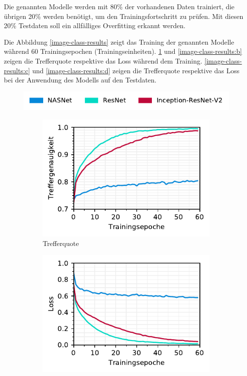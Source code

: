 Die genannten Modelle werden mit 80\% der vorhandenen Daten trainiert, die übrigen 20\% werden benötigt, um den Trainingsfortschritt zu prüfen. Mit diesen 20\% Testdaten soll ein allfälliges Overfitting erkannt werden.

Die Abbildung \ref{image-class-results} zeigt das Training der genannten Modelle während 60 Trainingsepochen (Trainingseinheiten). \ref{image-class-results:a} und \ref{image-class-results:b} zeigen die Trefferquote respektive das Loss während dem Training.  \ref{image-class-results:c} und \ref{image-class-results:d} zeigen die Trefferquote respektive das Loss bei der Anwendung des Modells auf den Testdaten. 

\begin{figure}[h!] 
  \captionsetup{width=.9\linewidth}
  \caption{Statistiken aus dem Training der Bild-basierten Klassifizierung von Rechnungen}
  \label{image-class-results} 
  \includegraphics[scale=1]{graphics/matplot/img-class__legend.pdf}
  \begin{subfigure}[b]{0.5\linewidth}
    \centering
    \includegraphics[scale=1]{graphics/matplot/img-class__acc.pdf}
    \caption{Trefferquote} 
    \label{image-class-results:a} 
    \vspace{2ex}
  \end{subfigure}%
  \begin{subfigure}[b]{0.5\linewidth}
    \centering
    \includegraphics[scale=1]{graphics/matplot/img-class__loss.pdf}

\end{subfigure}
\end{figure}
